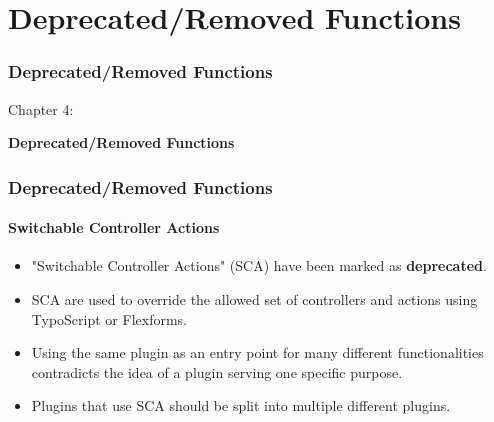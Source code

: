 %

\section{Deprecated/Removed Functions}
\begin{frame}[fragile]
	\frametitle{Deprecated/Removed Functions}

	\begin{center}\huge{Chapter 4:}\end{center}
	\begin{center}\huge{\color{typo3darkgrey}\textbf{Deprecated/Removed Functions}}\end{center}

\end{frame}


\begin{frame}[fragile]
	\frametitle{Deprecated/Removed Functions}
	\framesubtitle{Switchable Controller Actions}

	\begin{itemize}
		\item "Switchable Controller Actions" (SCA) have been marked as \textbf{deprecated}.
		\item SCA are used to override the allowed set of controllers and actions using TypoScript or Flexforms.
		\item Using the same plugin as an entry point for many different functionalities contradicts the idea of a plugin serving one specific purpose.
		\item Plugins that use SCA should be split into multiple different plugins.
	\end{itemize}

\end{frame}


